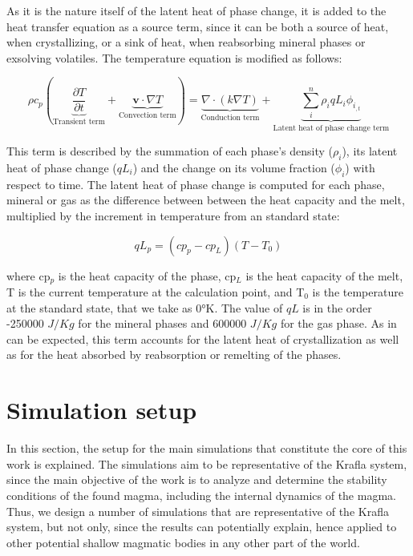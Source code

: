 As it is the nature itself of the latent heat of phase change, it is added to the heat transfer equation as a source term, since it can be both a source of heat, when crystallizing, or a sink of heat, when reabsorbing mineral phases or exsolving volatiles. The temperature equation is modified as follows:

\begin{equation}
	\rho c_p \left(\underbrace{\frac{\partial T}{\partial t}}_{\text{Transient term}} + \underbrace{\mathbf{v} \cdot \nabla T }_{\text{Convection term}}\right) = \underbrace{\nabla \cdot (k \nabla T)}_{\text{Conduction term}} + \underbrace{\sum_{i}^n\rho_iqL_i\phi_{i_{,t}}}_{\text{Latent heat of phase change term}}
\end{equation}

This term is described by the summation of each phase's density ($\rho_i$), its latent heat of phase change ($qL_i$) and the change on its volume fraction ($\phi_i$) with respect to time. The latent heat of phase change is computed for each phase, mineral or gas as the difference between between the heat capacity and the melt, multiplied by the increment in temperature from an standard state:

\begin{equation}
	qL_p = (cp_p-cp_L)(T-T_0)
\end{equation}

where cp$_p$ is the heat capacity of the phase, cp$_L$ is the heat capacity of the melt, T is the current temperature at the calculation point, and T$_0$ is the temperature at the standard state, that we take as 0°K. The value of $qL$ is in the order -250000 $J/Kg$ for the mineral phases and 600000 $J/Kg$ for the gas phase. As in can be expected, this term accounts for the latent heat of crystallization as well as for the heat absorbed by reabsorption or remelting of the phases.


\section{Simulation setup}
In this section, the setup for the main simulations that constitute the core of this work is explained. The simulations aim to be representative of the Krafla system, since the main objective of the work is to analyze and determine the stability conditions of the found magma, including the internal dynamics of the magma. Thus, we design a number of simulations that are representative of the Krafla system, but not only, since the results can potentially explain, hence applied to other potential shallow magmatic bodies in any other part of the world. 

